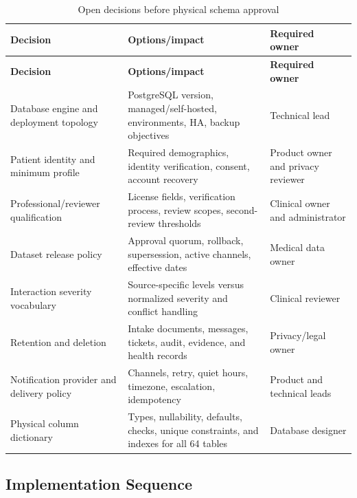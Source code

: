 \begin{longtable}{L{5.0cm}L{6.2cm}L{4.0cm}}
\caption{Open decisions before physical schema approval}\label{tab:open-decisions}\\
\toprule
\textbf{Decision} & \textbf{Options/impact} & \textbf{Required owner}\\
\midrule
\endfirsthead
\toprule
\textbf{Decision} & \textbf{Options/impact} & \textbf{Required owner}\\
\midrule
\endhead
Database engine and deployment topology & PostgreSQL version, managed/self-hosted, environments, HA, backup objectives & Technical lead\\
Patient identity and minimum profile & Required demographics, identity verification, consent, account recovery & Product owner and privacy reviewer\\
Professional/reviewer qualification & License fields, verification process, review scopes, second-review thresholds & Clinical owner and administrator\\
Dataset release policy & Approval quorum, rollback, supersession, active channels, effective dates & Medical data owner\\
Interaction severity vocabulary & Source-specific levels versus normalized severity and conflict handling & Clinical reviewer\\
Retention and deletion & Intake documents, messages, tickets, audit, evidence, and health records & Privacy/legal owner\\
Notification provider and delivery policy & Channels, retry, quiet hours, timezone, escalation, idempotency & Product and technical leads\\
Physical column dictionary & Types, nullability, defaults, checks, unique constraints, and indexes for all 64 tables & Database designer\\
\bottomrule
\end{longtable}

\subsection{Implementation Sequence}

